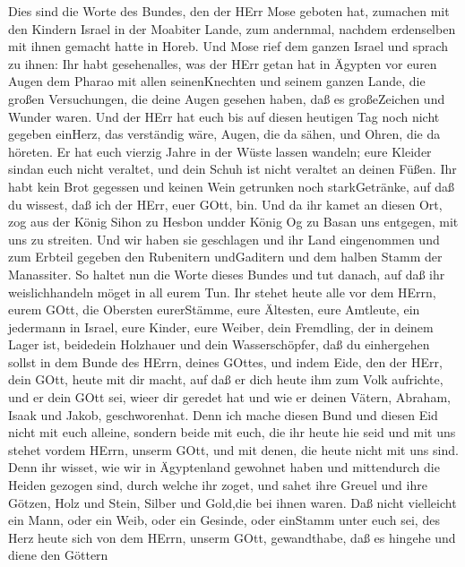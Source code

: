  Dies sind die Worte des Bundes, den der HErr Mose geboten
hat, zumachen mit den Kindern Israel in der Moabiter Lande, zum
andernmal, nachdem erdenselben mit ihnen gemacht hatte in Horeb.
 Und Mose rief dem ganzen Israel und sprach zu ihnen: Ihr
habt gesehenalles, was der HErr getan hat in Ägypten vor euren Augen dem
Pharao mit allen seinenKnechten und seinem ganzen Lande, 
die großen Versuchungen, die deine Augen gesehen haben, daß es
großeZeichen und Wunder waren.  Und der HErr hat euch bis
auf diesen heutigen Tag noch nicht gegeben einHerz, das verständig wäre,
Augen, die da sähen, und Ohren, die da höreten.  Er hat euch
vierzig Jahre in der Wüste lassen wandeln; eure Kleider sindan euch
nicht veraltet, und dein Schuh ist nicht veraltet an deinen Füßen.
 Ihr habt kein Brot gegessen und keinen Wein getrunken noch
starkGetränke, auf daß du wissest, daß ich der HErr, euer GOtt, bin.
 Und da ihr kamet an diesen Ort, zog aus der König Sihon zu
Hesbon undder König Og zu Basan uns entgegen, mit uns zu streiten. Und
wir haben sie geschlagen  und ihr Land eingenommen und zum
Erbteil gegeben den Rubenitern undGaditern und dem halben Stamm der
Manassiter.  So haltet nun die Worte dieses Bundes und tut
danach, auf daß ihr weislichhandeln möget in all eurem Tun.
 Ihr stehet heute alle vor dem HErrn, eurem GOtt, die
Obersten eurerStämme, eure Ältesten, eure Amtleute, ein jedermann in
Israel,  eure Kinder, eure Weiber, dein Fremdling, der in
deinem Lager ist, beidedein Holzhauer und dein Wasserschöpfer,
 daß du einhergehen sollst in dem Bunde des HErrn, deines
GOttes, und indem Eide, den der HErr, dein GOtt, heute mit dir macht,
 auf daß er dich heute ihm zum Volk aufrichte, und er dein
GOtt sei, wieer dir geredet hat und wie er deinen Vätern, Abraham, Isaak
und Jakob, geschworenhat.  Denn ich mache diesen Bund und
diesen Eid nicht mit euch alleine,  sondern beide mit euch,
die ihr heute hie seid und mit uns stehet vordem HErrn, unserm GOtt, und
mit denen, die heute nicht mit uns sind.  Denn ihr wisset,
wie wir in Ägyptenland gewohnet haben und mittendurch die Heiden gezogen
sind, durch welche ihr zoget,  und sahet ihre Greuel und
ihre Götzen, Holz und Stein, Silber und Gold,die bei ihnen waren.
 Daß nicht vielleicht ein Mann, oder ein Weib, oder ein
Gesinde, oder einStamm unter euch sei, des Herz heute sich von dem
HErrn, unserm GOtt, gewandthabe, daß es hingehe und diene den Göttern
